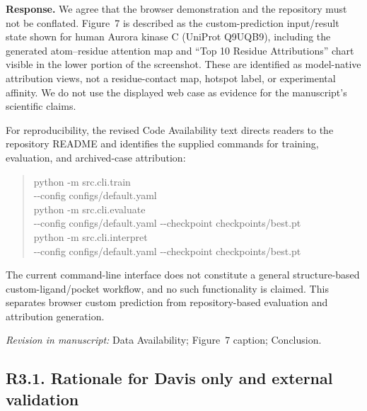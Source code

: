 \documentclass[11pt,a4paper]{article}
\newcommand{\response}{\noindent\textbf{Response.} }
\newcommand{\change}[1]{\par\smallskip\noindent\textit{Revision in manuscript:} #1\par\medskip}
\begin{document}
\response We agree that the browser demonstration and the repository must not
be conflated. Figure~7 is described as the
custom-prediction input/result state shown for human Aurora kinase C (UniProt
Q9UQB9), including the generated atom--residue attention map and ``Top 10
Residue Attributions'' chart visible in the lower portion of the screenshot.
These are identified as model-native attribution views, not a residue-contact
map, hotspot label, or experimental affinity. We do not use the displayed web
case as evidence for the manuscript's scientific claims.

For reproducibility, the revised Code Availability text directs readers to the
repository README and identifies the supplied commands for training, evaluation,
and archived-case attribution:
\begin{quote}\footnotesize\ttfamily
python -m src.cli.train\\
\quad -{}-config configs/default.yaml\\
python -m src.cli.evaluate\\
\quad -{}-config configs/default.yaml -{}-checkpoint checkpoints/best.pt\\
python -m src.cli.interpret\\
\quad -{}-config configs/default.yaml -{}-checkpoint checkpoints/best.pt
\end{quote}
The current command-line interface does not constitute a
general structure-based custom-ligand/pocket workflow, and no such functionality
is claimed. This separates browser custom prediction from repository-based
evaluation and attribution generation.

\change{Data Availability; Figure~7 caption; Conclusion.}

\subsection*{R3.1. Rationale for Davis only and external validation}
\end{document}
